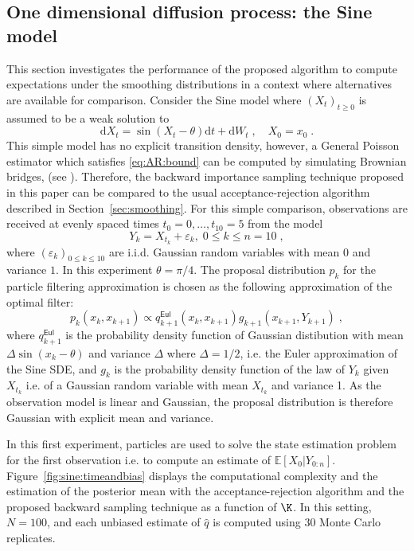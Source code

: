 \documentclass[12pt]{article}
\def\pE{\mathbb{E}}
\newcommand{\rmd}{\ensuremath{\mathrm{d}}}
\newcommand{\eqsp}{\;}
\begin{document}
\subsection{One dimensional diffusion process: the Sine model}
\label{sec:simu:SINE}
This section investigates the performance of the proposed algorithm to compute  expectations under the smoothing distributions in a context where  alternatives are available for comparison. Consider the Sine model where $(X_t)_{t\geqslant 0}$ is assumed to be a weak solution to
$$
\rmd X_t = \sin(X_t-\theta)\rmd t + \rmd W_t\eqsp,\quad X_0 = x_0\eqsp.
$$
This simple model has no explicit transition density, however, a General Poisson estimator which satisfies \eqref{eq:AR:bound} can be computed by simulating Brownian bridges, (see \cite{beskos2006exact}). 
Therefore, the backward importance sampling technique proposed in this paper can be compared to the usual acceptance-rejection algorithm described in Section~\ref{sec:smoothing}. 
For this simple comparison, observations are received at evenly spaced times $t_0=0,\ldots, t_{10} = 5$ from the model
\begin{equation}
\label{eq:obs:model:SINE}
Y_k=X_{t_k}+\varepsilon_k,\eqsp 0\leqslant k \leqslant n = 10\eqsp,
\end{equation}
where $(\varepsilon_k)_{0 \leqslant k\leqslant 10}$ are i.i.d. Gaussian random variables with mean $0$ and variance $1$. In this experiment $\theta = \pi/4$. 
The proposal distribution $p_k$ for the particle filtering approximation is chosen as the following approximation of the optimal filter:
\begin{equation}
\label{eq:optimal:filter}
p_{k}(x_{k},x_{k+1})\!\propto\! q^{\mathsf{Eul}}_{k+1}(x_{k},x_{k+1})g_{k+1}(x_{k+1},Y_{k+1})\eqsp,
\end{equation}
where $q^{\mathsf{Eul}}_{k+1}$ is the probability density function of Gaussian distibution with mean $\Delta \sin(x_k-\theta)$ and variance $\Delta$ where $\Delta = 1/2$, i.e. the Euler approximation of the Sine SDE, and $g_k$ is the probability density function of the law of $Y_k$ given $X_{t_k}$ i.e. of a Gaussian random variable with mean $X_{t_k}$ and variance 1. 
As the observation model is linear and Gaussian, the proposal distribution is therefore Gaussian with explicit mean and variance. 

In this first experiment, particles are used to solve the state estimation problem for the first observation i.e. to compute an estimate of $ \pE[ X_{0} | Y_{0:n}]$.
Figure~\ref{fig:sine:timeandbias} displays the computational complexity and the estimation of the posterior mean with the acceptance-rejection algorithm and the proposed backward sampling technique as a function of $\K$. 
In this setting, $N=100$, and each unbiased estimate of $\hat{q}$ is computed using 30 Monte Carlo replicates.
\end{document}
